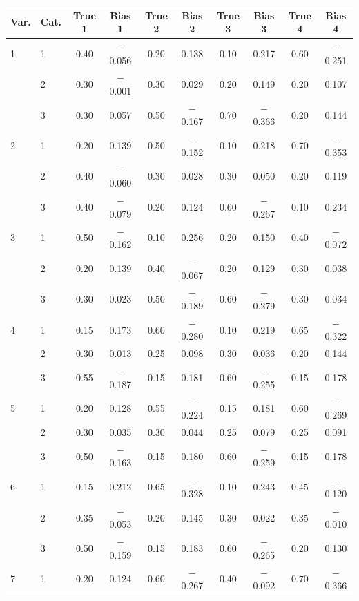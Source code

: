 \begin{longtable}{llcccccccc}
  \toprule
\textbf{Var.} & \textbf{Cat.} & \textbf{True 1} & \textbf{Bias 1} & \textbf{True 2} & \textbf{Bias 2} & \textbf{True 3} & \textbf{Bias 3} & \textbf{True 4} & \textbf{Bias 4} \\ 
  \midrule
1 & 1 & 0.40 & $-$0.056 & 0.20 & 0.138 & 0.10 & 0.217 & 0.60 & $-$0.251 \\ 
   & 2 & 0.30 & $-$0.001 & 0.30 & 0.029 & 0.20 & 0.149 & 0.20 & 0.107 \\ 
   & 3 & 0.30 & 0.057 & 0.50 & $-$0.167 & 0.70 & $-$0.366 & 0.20 & 0.144 \\ 
  2 & 1 & 0.20 & 0.139 & 0.50 & $-$0.152 & 0.10 & 0.218 & 0.70 & $-$0.353 \\ 
   & 2 & 0.40 & $-$0.060 & 0.30 & 0.028 & 0.30 & 0.050 & 0.20 & 0.119 \\ 
   & 3 & 0.40 & $-$0.079 & 0.20 & 0.124 & 0.60 & $-$0.267 & 0.10 & 0.234 \\ 
  3 & 1 & 0.50 & $-$0.162 & 0.10 & 0.256 & 0.20 & 0.150 & 0.40 & $-$0.072 \\ 
   & 2 & 0.20 & 0.139 & 0.40 & $-$0.067 & 0.20 & 0.129 & 0.30 & 0.038 \\ 
   & 3 & 0.30 & 0.023 & 0.50 & $-$0.189 & 0.60 & $-$0.279 & 0.30 & 0.034 \\ 
  4 & 1 & 0.15 & 0.173 & 0.60 & $-$0.280 & 0.10 & 0.219 & 0.65 & $-$0.322 \\ 
   & 2 & 0.30 & 0.013 & 0.25 & 0.098 & 0.30 & 0.036 & 0.20 & 0.144 \\ 
   & 3 & 0.55 & $-$0.187 & 0.15 & 0.181 & 0.60 & $-$0.255 & 0.15 & 0.178 \\ 
  5 & 1 & 0.20 & 0.128 & 0.55 & $-$0.224 & 0.15 & 0.181 & 0.60 & $-$0.269 \\ 
   & 2 & 0.30 & 0.035 & 0.30 & 0.044 & 0.25 & 0.079 & 0.25 & 0.091 \\ 
   & 3 & 0.50 & $-$0.163 & 0.15 & 0.180 & 0.60 & $-$0.259 & 0.15 & 0.178 \\ 
  6 & 1 & 0.15 & 0.212 & 0.65 & $-$0.328 & 0.10 & 0.243 & 0.45 & $-$0.120 \\ 
   & 2 & 0.35 & $-$0.053 & 0.20 & 0.145 & 0.30 & 0.022 & 0.35 & $-$0.010 \\ 
   & 3 & 0.50 & $-$0.159 & 0.15 & 0.183 & 0.60 & $-$0.265 & 0.20 & 0.130 \\ 
  7 & 1 & 0.20 & 0.124 & 0.60 & $-$0.267 & 0.40 & $-$0.092 & 0.70 & $-$0.366 \\ 

\end{longtable}
